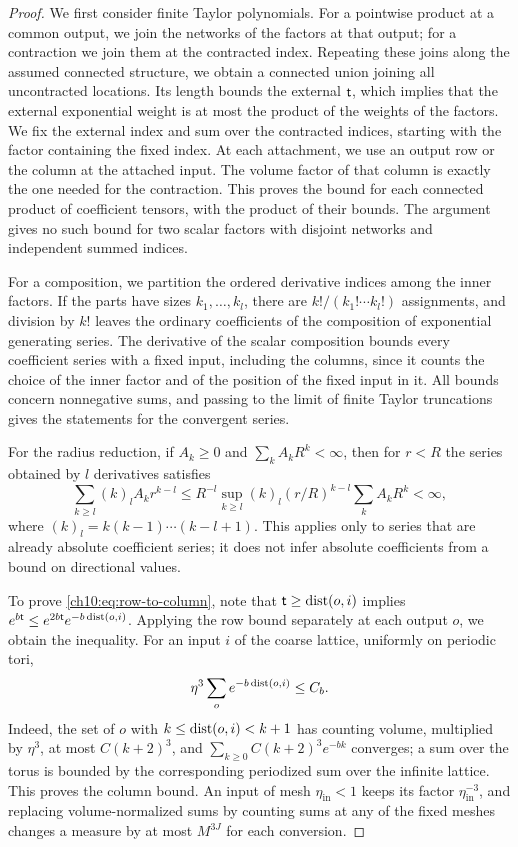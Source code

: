 \begin{proof}
We first consider finite Taylor polynomials. For a pointwise product at a common output, we join the networks of the factors at that output; for a contraction we join them at the contracted index. Repeating these joins along the assumed connected structure, we obtain a connected union joining all uncontracted locations. Its length bounds the external $\mathsf t$, which implies that the external exponential weight is at most the product of the weights of the factors. We fix the external index and sum over the contracted indices, starting with the factor containing the fixed index. At each attachment, we use an output row or the column at the attached input. The volume factor of that column is exactly the one needed for the contraction. This proves the bound for each connected product of coefficient tensors, with the product of their bounds. The argument gives no such bound for two scalar factors with disjoint networks and independent summed indices.

For a composition, we partition the ordered derivative indices among the inner factors. If the parts have sizes $k_1,\ldots,k_l$, there are $k!/(k_1!\cdots k_l!)$ assignments, and division by $k!$ leaves the ordinary coefficients of the composition of exponential generating series. The derivative of the scalar composition bounds every coefficient series with a fixed input, including the columns, since it counts the choice of the inner factor and of the position of the fixed input in it. All bounds concern nonnegative sums, and passing to the limit of finite Taylor truncations gives the statements for the convergent series.

For the radius reduction, if $A_k\ge0$ and $\sum_kA_kR^k<\infty$, then for $r<R$ the series obtained by $l$ derivatives satisfies
\[
 \sum_{k\ge l}(k)_lA_kr^{k-l}\le R^{-l}\sup_{k\ge l}(k)_l(r/R)^{k-l}\sum_kA_kR^k<\infty,
\]
where $(k)_l=k(k-1)\cdots(k-l+1)$. This applies only to series that are already absolute coefficient series; it does not infer absolute coefficients from a bound on directional values.

To prove \eqref{ch10:eq:row-to-column}, note that $\mathsf t\ge\operatorname{dist}(o,i)$ implies $e^{b\mathsf t}\le e^{2b\mathsf t}e^{-b\operatorname{dist}(o,i)}$. Applying the row bound separately at each output $o$, we obtain the inequality. For an input $i$ of the coarse lattice, uniformly on periodic tori,
\[
 \eta^3\sum_oe^{-b\operatorname{dist}(o,i)}\le C_b.
\]
Indeed, the set of $o$ with $k\le\operatorname{dist}(o,i)<k+1$ has counting volume, multiplied by $\eta^3$, at most $C(k+2)^3$, and $\sum_{k\ge0}C(k+2)^3e^{-bk}$ converges; a sum over the torus is bounded by the corresponding periodized sum over the infinite lattice. This proves the column bound. An input of mesh $\eta_{\mathrm{in}}<1$ keeps its factor $\eta_{\mathrm{in}}^{-3}$, and replacing volume-normalized sums by counting sums at any of the fixed meshes changes a measure by at most $M^{3J}$ for each conversion.


\end{proof}
